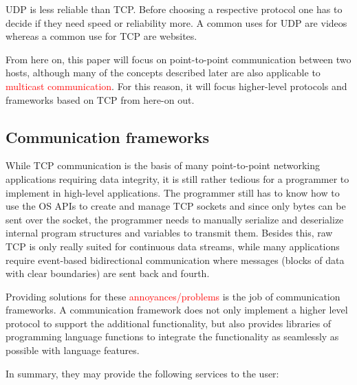 \documentclass[conference]{IEEEtran}
\begin{document}
UDP is less reliable than TCP. Before choosing a respective protocol one has to decide if they need speed or reliability more. A common uses for UDP are videos whereas a common use for TCP are websites.



From here on, this paper will focus on point-to-point communication between two hosts, although many of the concepts described later are also applicable to \textcolor{red}{multicast communication}.
For this reason, it will focus higher-level protocols and frameworks based on TCP from here-on out.

\subsection{Communication frameworks}

While TCP communication is the basis of many point-to-point networking applications requiring data integrity, it is still rather tedious for a programmer to implement in high-level applications. The programmer still has to know how to use the OS APIs to create and manage TCP sockets and since only bytes can be sent over the socket, the programmer needs to manually serialize and deserialize internal program structures and variables to transmit them. Besides this, raw TCP is only really suited for continuous data streams, while many applications require event-based bidirectional communication where messages (blocks of data with clear boundaries) are sent back and fourth.

Providing solutions for these \textcolor{red}{annoyances/problems} is the job of communication frameworks. A communication framework does not only implement a higher level protocol to support the additional functionality, but also provides libraries of programming language functions to integrate the functionality as seamlessly as possible with language features.

In summary, they may provide the following services to the user:
\end{document}
